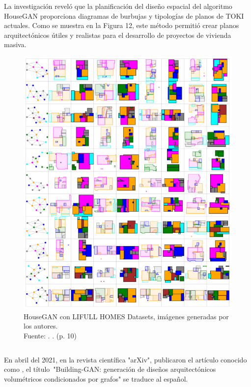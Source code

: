 La investigación reveló que la planificación del diseño espacial del algoritmo HouseGAN proporciona diagramas de burbujas y tipologías de planos de TOKI actuales. Como se muestra en la Figura 12, este método permitió crear planos arquitectónicos útiles y realistas para el desarrollo de proyectos de vivienda masiva.

\begin{figure}[!ht]
	\begin{center}
		\includegraphics[width=1\textwidth]{2/figures/ozerol2023.png}
		\caption[HouseGAN con LIFULL HOMES Datasets, imágenes generadas por los autores]{HouseGAN con LIFULL HOMES Datasets, imágenes generadas por los autores.\\
		Fuente: \cite{pr_ozerol2023genermass}. . (p. 10)}
		\label{2:fig120}
	\end{center}
\end{figure}

\subsection{}
En abril del 2021, en la revista científica "arXiv", \cite{pr_chang2021buildinggan} publicaron el artículo conocido como , el título "Building-GAN: generación de diseños arquitectónicos volumétricos condicionados por grafos" se traduce al español.

